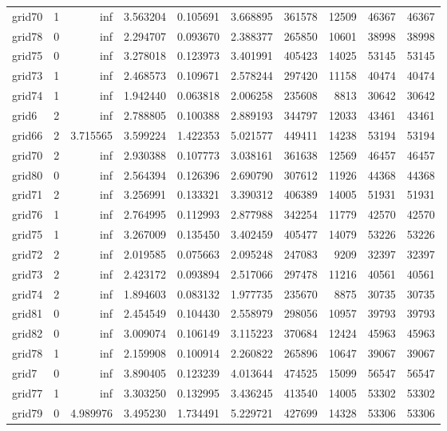 \begin{longtable}{|l|r|r|r|r|r|r|r|r|r|}
grid70 & 1 & inf & 3.563204 & 0.105691 & 3.668895 & 361578 & 12509 & 46367 & 46367 \\
grid78 & 0 & inf & 2.294707 & 0.093670 & 2.388377 & 265850 & 10601 & 38998 & 38998 \\
grid75 & 0 & inf & 3.278018 & 0.123973 & 3.401991 & 405423 & 14025 & 53145 & 53145 \\
grid73 & 1 & inf & 2.468573 & 0.109671 & 2.578244 & 297420 & 11158 & 40474 & 40474 \\
grid74 & 1 & inf & 1.942440 & 0.063818 & 2.006258 & 235608 & 8813 & 30642 & 30642 \\
grid6 & 2 & inf & 2.788805 & 0.100388 & 2.889193 & 344797 & 12033 & 43461 & 43461 \\
grid66 & 2 & 3.715565 & 3.599224 & 1.422353 & 5.021577 & 449411 & 14238 & 53194 & 53194 \\
grid70 & 2 & inf & 2.930388 & 0.107773 & 3.038161 & 361638 & 12569 & 46457 & 46457 \\
grid80 & 0 & inf & 2.564394 & 0.126396 & 2.690790 & 307612 & 11926 & 44368 & 44368 \\
grid71 & 2 & inf & 3.256991 & 0.133321 & 3.390312 & 406389 & 14005 & 51931 & 51931 \\
grid76 & 1 & inf & 2.764995 & 0.112993 & 2.877988 & 342254 & 11779 & 42570 & 42570 \\
grid75 & 1 & inf & 3.267009 & 0.135450 & 3.402459 & 405477 & 14079 & 53226 & 53226 \\
grid72 & 2 & inf & 2.019585 & 0.075663 & 2.095248 & 247083 & 9209 & 32397 & 32397 \\
grid73 & 2 & inf & 2.423172 & 0.093894 & 2.517066 & 297478 & 11216 & 40561 & 40561 \\
grid74 & 2 & inf & 1.894603 & 0.083132 & 1.977735 & 235670 & 8875 & 30735 & 30735 \\
grid81 & 0 & inf & 2.454549 & 0.104430 & 2.558979 & 298056 & 10957 & 39793 & 39793 \\
grid82 & 0 & inf & 3.009074 & 0.106149 & 3.115223 & 370684 & 12424 & 45963 & 45963 \\
grid78 & 1 & inf & 2.159908 & 0.100914 & 2.260822 & 265896 & 10647 & 39067 & 39067 \\
grid7 & 0 & inf & 3.890405 & 0.123239 & 4.013644 & 474525 & 15099 & 56547 & 56547 \\
grid77 & 1 & inf & 3.303250 & 0.132995 & 3.436245 & 413540 & 14005 & 53302 & 53302 \\
grid79 & 0 & 4.989976 & 3.495230 & 1.734491 & 5.229721 & 427699 & 14328 & 53306 & 53306 \\

\end{longtable}
